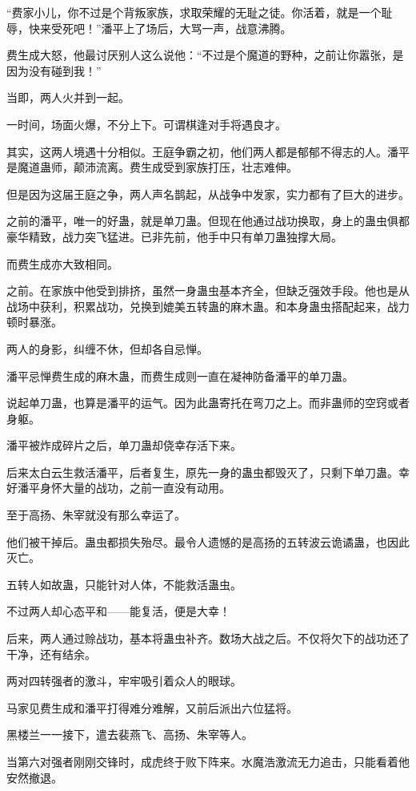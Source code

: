 \begin{this_body}
“费家小儿，你不过是个背叛家族，求取荣耀的无耻之徒。你活着，就是一个耻辱，快来受死吧！”潘平上了场后，大骂一声，战意沸腾。

费生成大怒，他最讨厌别人这么说他：“不过是个魔道的野种，之前让你嚣张，是因为没有碰到我！”

当即，两人火并到一起。

一时间，场面火爆，不分上下。可谓棋逢对手将遇良才。

其实，这两人境遇十分相似。王庭争霸之初，他们两人都是郁郁不得志的人。潘平是魔道蛊师，颠沛流离。费生成受到家族打压，壮志难伸。

但是因为这届王庭之争，两人声名鹊起，从战争中发家，实力都有了巨大的进步。

之前的潘平，唯一的好蛊，就是单刀蛊。但现在他通过战功换取，身上的蛊虫俱都豪华精致，战力突飞猛进。已非先前，他手中只有单刀蛊独撑大局。

而费生成亦大致相同。

之前。在家族中他受到排挤，虽然一身蛊虫基本齐全，但缺乏强效手段。他也是从战场中获利，积累战功，兑换到媲美五转蛊的麻木蛊。和本身蛊虫搭配起来，战力顿时暴涨。

两人的身影，纠缠不休，但却各自忌惮。

潘平忌惮费生成的麻木蛊，而费生成则一直在凝神防备潘平的单刀蛊。

说起单刀蛊，也算是潘平的运气。因为此蛊寄托在弯刀之上。而非蛊师的空窍或者身躯。

潘平被炸成碎片之后，单刀蛊却侥幸存活下来。

后来太白云生救活潘平，后者复生，原先一身的蛊虫都毁灭了，只剩下单刀蛊。幸好潘平身怀大量的战功，之前一直没有动用。

至于高扬、朱宰就没有那么幸运了。

他们被干掉后。蛊虫都损失殆尽。最令人遗憾的是高扬的五转波云诡谲蛊，也因此灭亡。

五转人如故蛊，只能针对人体，不能救活蛊虫。

不过两人却心态平和——能复活，便是大幸！

后来，两人通过赊战功，基本将蛊虫补齐。数场大战之后。不仅将欠下的战功还了干净，还有结余。

两对四转强者的激斗，牢牢吸引着众人的眼球。

马家见费生成和潘平打得难分难解，又前后派出六位猛将。

黑楼兰一一接下，遣去裴燕飞、高扬、朱宰等人。

当第六对强者刚刚交锋时，成虎终于败下阵来。水魔浩激流无力追击，只能看着他安然撤退。


\end{this_body}
